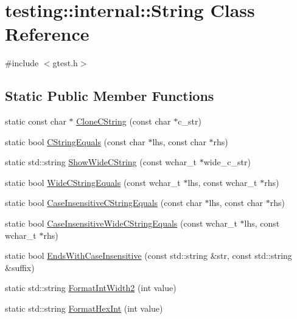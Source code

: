 \hypertarget{classtesting_1_1internal_1_1_string}{\section{testing\-:\-:internal\-:\-:String Class Reference}
\label{classtesting_1_1internal_1_1_string}
}


{\ttfamily \#include $<$gtest.\-h$>$}

\subsection*{Static Public Member Functions}
\begin{DoxyCompactItemize}
\item 
static const char $\ast$ \hyperlink{classtesting_1_1internal_1_1_string_a8bce6b1281ae3d2f9061b920aa78aca0}{Clone\-C\-String} (const char $\ast$c\-\_\-str)
\item 
static bool \hyperlink{classtesting_1_1internal_1_1_string_a8bea7b33e7effbd299a0b4a5522ea96e}{C\-String\-Equals} (const char $\ast$lhs, const char $\ast$rhs)
\item 
static std\-::string \hyperlink{classtesting_1_1internal_1_1_string_aaf7e376ff580677ea4954d5913d5b917}{Show\-Wide\-C\-String} (const wchar\-\_\-t $\ast$wide\-\_\-c\-\_\-str)
\item 
static bool \hyperlink{classtesting_1_1internal_1_1_string_ab0373bf6e96453d6ca0de2e68df13d3a}{Wide\-C\-String\-Equals} (const wchar\-\_\-t $\ast$lhs, const wchar\-\_\-t $\ast$rhs)
\item 
static bool \hyperlink{classtesting_1_1internal_1_1_string_a116ca435d63306927ba19f90a3596787}{Case\-Insensitive\-C\-String\-Equals} (const char $\ast$lhs, const char $\ast$rhs)
\item 
static bool \hyperlink{classtesting_1_1internal_1_1_string_a1f12d1780ca7afbf8975f5d425b9f362}{Case\-Insensitive\-Wide\-C\-String\-Equals} (const wchar\-\_\-t $\ast$lhs, const wchar\-\_\-t $\ast$rhs)
\item 
static bool \hyperlink{classtesting_1_1internal_1_1_string_a968f242b709f8c7c0ed5ecf246553321}{Ends\-With\-Case\-Insensitive} (const std\-::string \&str, const std\-::string \&suffix)
\item 
static std\-::string \hyperlink{classtesting_1_1internal_1_1_string_af50b18d588355871e1982c4043523e0f}{Format\-Int\-Width2} (int value)
\item 
static std\-::string \hyperlink{classtesting_1_1internal_1_1_string_affe59102e49092fc0684388e9b0c5c1e}{Format\-Hex\-Int} (int value)

\end{DoxyCompactItemize}
